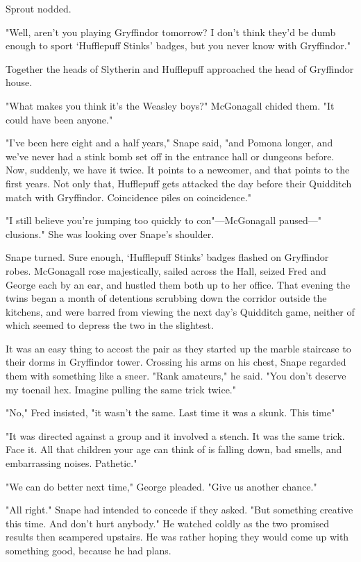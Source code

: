 Sprout nodded.

"Well, aren't you playing Gryffindor tomorrow? I don't think they'd be dumb enough to sport `Hufflepuff Stinks' badges, but you never know with Gryffindor."

Together the heads of Slytherin and Hufflepuff approached the head of Gryffindor house.

"What makes you think it's the Weasley boys?" McGonagall chided them. "It could have been anyone."

"I've been here eight and a half years," Snape said, "and Pomona longer, and we've never had a stink bomb set off in the entrance hall or dungeons before. Now, suddenly, we have it twice. It points to a newcomer, and that points to the first years. Not only that, Hufflepuff gets attacked the day before their Quidditch match with Gryffindor. Coincidence piles on coincidence."

"I still believe you're jumping too quickly to con{\el}"—McGonagall paused—"{\el} clusions." She was looking over Snape's shoulder.

Snape turned. Sure enough, `Hufflepuff Stinks' badges flashed on Gryffindor robes. McGonagall rose majestically, sailed across the Hall, seized Fred and George each by an ear, and hustled them both up to her office. That evening the twins began a month of detentions scrubbing down the corridor outside the kitchens, and were barred from viewing the next day's Quidditch game, neither of which seemed to depress the two in the slightest.

It was an easy thing to accost the pair as they started up the marble staircase to their dorms in Gryffindor tower. Crossing his arms on his chest, Snape regarded them with something like a sneer. "Rank amateurs," he said. "You don't deserve my toenail hex. Imagine pulling the same trick twice."

"No," Fred insisted, "it wasn't the same. Last time it was a skunk. This time{\el}"

"It was directed against a group and it involved a stench. It was the same trick. Face it. All that children your age can think of is falling down, bad smells, and embarrassing noises. Pathetic."

"We can do better next time," George pleaded. "Give us another chance."

"All right." Snape had intended to concede if they asked. "But something creative this time. And don't hurt anybody." He watched coldly as the two promised results then scampered upstairs. He was rather hoping they would come up with something good, because he had plans.

